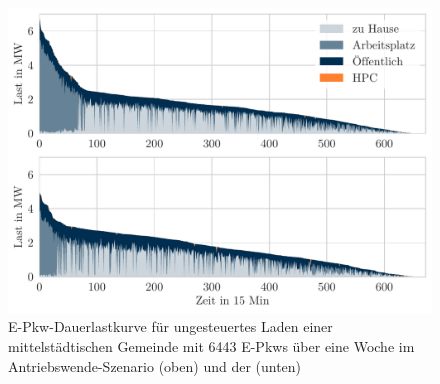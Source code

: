 \begin{figure}[H]
    \centering
    \includegraphics[width=\textwidth]{Bilder/example_load_duration_curve}
    \caption{E-Pkw-Dauerlastkurve für ungesteuertes Laden einer mittelstädtischen Gemeinde mit \num{6443} E-Pkws über eine Woche im Antriebswende-Szenario (oben) und der \SzeFirmenparkplatz (unten)}\label{fig:example_load_curve}
\end{figure}